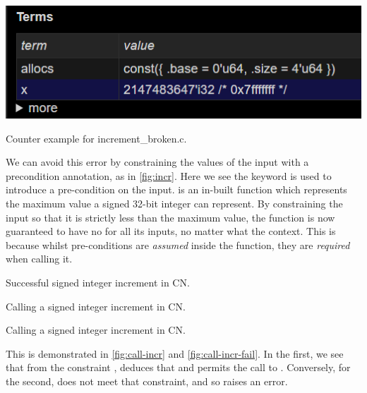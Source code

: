 \begin{marginfigure}
    \centering
    \includegraphics[width=\textwidth]{figures/increment_broken_state.png}
    \caption{Counter example for increment\_broken.c.}\label{fig:incr-broken-counter-ex}
\end{marginfigure}

We can avoid this error by constraining the values of the input with a
precondition annotation, as in \cref{fig:incr}. Here we see the keyword
 is used to introduce a pre-condition on the input.
 is an in-built function which represents the maximum value a
signed 32-bit integer can represent. By constraining the input so that it is
strictly less than the maximum value, the function is now guaranteed to have
no  for all its inputs, no matter what the context. This is because
whilst pre-conditions are \emph{assumed} inside the function, they are
\emph{required} when calling it.

\begin{marginfigure}
    \centering
    \caption{Successful signed integer increment in CN.}\label{fig:incr}
\end{marginfigure}

\begin{marginfigure}
    \ContinuedFloat*
    \centering
    \caption{Calling a signed integer increment in CN.}\label{fig:call-incr}
\end{marginfigure}

\begin{marginfigure}
    \ContinuedFloat{}
    \centering
    \caption{Calling a signed integer increment in CN.}\label{fig:call-incr-fail}
\end{marginfigure}

This is demonstrated in \cref{fig:call-incr} and \cref{fig:call-incr-fail}. In
the first, we see that from the constraint ,  deduces that  and permits the call to .
Conversely, for the second,  does not meet that constraint,
and so  raises an error.

